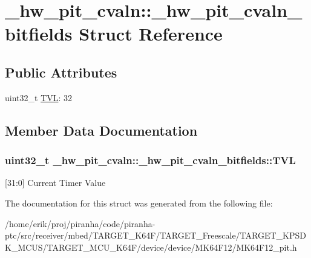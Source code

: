 \hypertarget{struct__hw__pit__cvaln_1_1__hw__pit__cvaln__bitfields}{}\section{\+\_\+hw\+\_\+pit\+\_\+cvaln\+:\+:\+\_\+hw\+\_\+pit\+\_\+cvaln\+\_\+bitfields Struct Reference}
\label{struct__hw__pit__cvaln_1_1__hw__pit__cvaln__bitfields}
\subsection*{Public Attributes}
\begin{DoxyCompactItemize}
\item 
uint32\+\_\+t \hyperlink{struct__hw__pit__cvaln_1_1__hw__pit__cvaln__bitfields_a3bfc81bf37fadc7bf572c5317634ab8e}{T\+VL}\+: 32
\end{DoxyCompactItemize}


\subsection{Member Data Documentation}
\subsubsection[{\texorpdfstring{T\+VL}{TVL}}]{\setlength{\rightskip}{0pt plus 5cm}uint32\+\_\+t \+\_\+hw\+\_\+pit\+\_\+cvaln\+::\+\_\+hw\+\_\+pit\+\_\+cvaln\+\_\+bitfields\+::\+T\+VL}\hypertarget{struct__hw__pit__cvaln_1_1__hw__pit__cvaln__bitfields_a3bfc81bf37fadc7bf572c5317634ab8e}{}\label{struct__hw__pit__cvaln_1_1__hw__pit__cvaln__bitfields_a3bfc81bf37fadc7bf572c5317634ab8e}
\mbox{[}31\+:0\mbox{]} Current Timer Value 

The documentation for this struct was generated from the following file\+:\begin{DoxyCompactItemize}
\item 
/home/erik/proj/piranha/code/piranha-\/ptc/src/receiver/mbed/\+T\+A\+R\+G\+E\+T\+\_\+\+K64\+F/\+T\+A\+R\+G\+E\+T\+\_\+\+Freescale/\+T\+A\+R\+G\+E\+T\+\_\+\+K\+P\+S\+D\+K\+\_\+\+M\+C\+U\+S/\+T\+A\+R\+G\+E\+T\+\_\+\+M\+C\+U\+\_\+\+K64\+F/device/device/\+M\+K64\+F12/M\+K64\+F12\+\_\+pit.\+h\end{DoxyCompactItemize}

